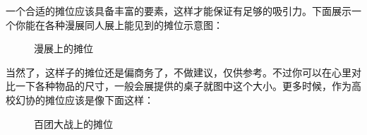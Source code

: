 一个合适的摊位应该具备丰富的要素，这样才能保证有足够的吸引力。下面展示一个你能在各种漫展同人展上能见到的摊位示意图：

\begin{figure}[H]
\centering
{}
\caption{漫展上的摊位}
\end{figure}

当然了，这样子的摊位还是偏商务了，不做建议，仅供参考。不过你可以在心里对比一下各种物品的尺寸，一般会展提供的桌子就图中这个大小。更多时候，作为高校幻协的摊位应该是像下面这样：

\begin{figure}[H]
\centering
{}
\caption{百团大战上的摊位}
\end{figure}

